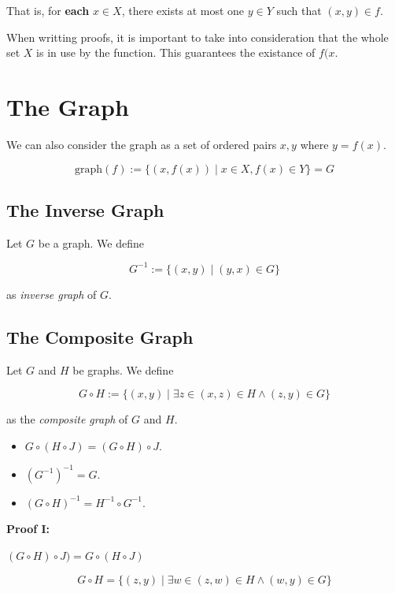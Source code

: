 That is, for \textbf{each} \( x \in X \), there exists at most one \( y \in Y \) such that \((x, y) \in f\).

When writting proofs, it is important to take into consideration that the whole set \(X\) is in use by the function. This guarantees 
the existance of \(f(x\).

\section{The Graph}

We can also consider the graph as a set of ordered pairs \(x, y\) where \(y = f(x)\).

\[
	\mathrm{graph}(f):= \{(x, f(x)) \mid x \in X, f(x) \in Y\} = G
\]

\subsection{The Inverse Graph}

Let \(G\) be a graph. We define 

\[
    G^{-1} := \{(x,y) \mid (y, x) \in G\}
\]

as \emph{inverse graph} of \(G\).

\subsection{The Composite Graph}

Let \(G\) and \(H\) be graphs. We define 

\[
    G \circ H := \{(x,y) \mid \exists z \in (x, z) \in H \land (z, y) \in G\}
\]

as the \emph{composite graph} of \(G\) and \(H\).

\begin{itemize}

    \item \(G \circ (H \circ J) = (G \circ H) \circ J\).

    \item \((G^{-1})^{-1} = G\).

    \item \((G \circ H)^{-1} = H^{-1} \circ G^{-1}\).

\end{itemize}

\textbf{Proof I:}

\((G \circ H) \circ J) = G \circ (H \circ J)\)

\[
	G \circ H = \{(z, y) \mid \exists w \in (z, w) \in H \land (w, y) \in G\} 
\]


